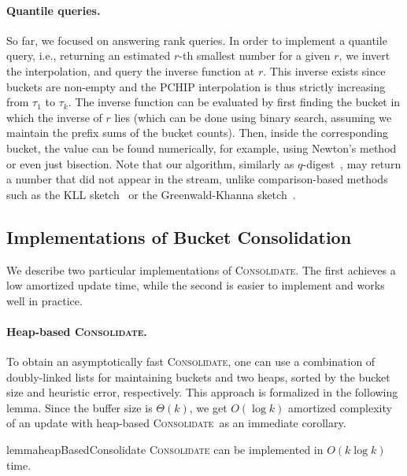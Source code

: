 \documentclass[acmsmall]{acmart}
\newcommand{\consolidate}{\textsc{Consolidate}\xspace}
\theoremstyle{remark}
\begin{document}
\paragraph{Quantile queries.} %
So far, we focused on answering rank queries.
In order to implement a quantile query, i.e., returning an estimated $r$-th smallest number for a given $r$,
we invert the interpolation, and query the inverse function at $r$.
This inverse exists since buckets are non-empty and the PCHIP interpolation is thus strictly increasing from $\tau_1$ to $\tau_k$.
The inverse function can be evaluated by first finding the bucket in which the inverse of $r$ lies (which can be done using binary search, assuming we maintain the prefix sums of the bucket counts). Then, inside the corresponding bucket, the value can be found numerically, for example, using Newton's method or even just bisection.
Note that our algorithm, similarly as $q$-digest~\cite{shrivastava2004medians}, may return a number that did not appear in the stream, unlike
comparison-based methods such as the KLL sketch~\cite{KarninLL16} or the Greenwald-Khanna sketch~\cite{greenwald2001space}.

\subsection{Implementations of Bucket Consolidation}
\label{sec:consolidateImpl}

We describe two particular implementations of \consolidate. The first achieves a low amortized update time,
while the second is easier to implement and works well in practice.

\vspace{-0.2cm}

\paragraph{Heap-based \consolidate.} 
To obtain an asymptotically fast \consolidate, one can use a combination of doubly-linked lists for maintaining buckets and two heaps, sorted by the bucket size and heuristic error, respectively.
This approach is formalized in the following lemma. %
Since the buffer size is $\Theta(k)$, we get $O(\log k)$ amortized complexity of an update with heap-based \consolidate\ as an immediate corollary.

\begin{restatable}{lemma}{heapBasedConsolidate}
	\label{lem:heapBasedConsolidate}
	\consolidate can be implemented in $O(k \log k)$ time.
\end{restatable}
\end{document}
